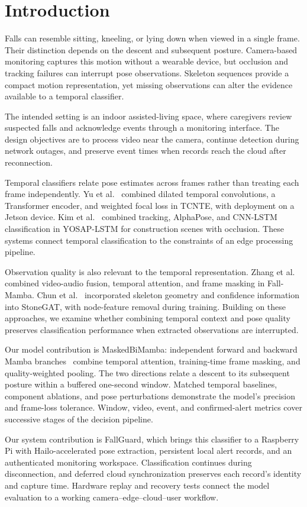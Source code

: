 \section{Introduction}

Falls can resemble sitting, kneeling, or lying down when viewed in a single frame. Their distinction depends on the descent and subsequent posture. Camera-based monitoring captures this motion without a wearable device, but occlusion and tracking failures can interrupt pose observations. Skeleton sequences provide a compact motion representation, yet missing observations can alter the evidence available to a temporal classifier.

The intended setting is an indoor assisted-living space, where caregivers review suspected falls and acknowledge events through a monitoring interface. The design objectives are to process video near the camera, continue detection during network outages, and preserve event times when records reach the cloud after reconnection.

Temporal classifiers relate pose estimates across frames rather than treating each frame independently. Yu et al.~\cite{yu2025tcnte} combined dilated temporal convolutions, a Transformer encoder, and weighted focal loss in TCNTE, with deployment on a Jetson device. Kim et al.~\cite{kim2025yosap} combined tracking, AlphaPose, and CNN-LSTM classification in YOSAP-LSTM for construction scenes with occlusion. These systems connect temporal classification to the constraints of an edge processing pipeline.

Observation quality is also relevant to the temporal representation. Zhang et al.~\cite{zhang2025fallmamba} combined video-audio fusion, temporal attention, and frame masking in Fall-Mamba. Chun et al.~\cite{chun2025stonegat} incorporated skeleton geometry and confidence information into StoneGAT, with node-feature removal during training. Building on these approaches, we examine whether combining temporal context and pose quality preserves classification performance when extracted observations are interrupted.

Our model contribution is MaskedBiMamba: independent forward and backward Mamba branches~\cite{gu2023mamba} combine temporal attention, training-time frame masking, and quality-weighted pooling. The two directions relate a descent to its subsequent posture within a buffered one-second window. Matched temporal baselines, component ablations, and pose perturbations demonstrate the model's precision and frame-loss tolerance. Window, video, event, and confirmed-alert metrics cover successive stages of the decision pipeline.

Our system contribution is FallGuard, which brings this classifier to a Raspberry Pi with Hailo-accelerated pose extraction, persistent local alert records, and an authenticated monitoring workspace. Classification continues during disconnection, and deferred cloud synchronization preserves each record's identity and capture time. Hardware replay and recovery tests connect the model evaluation to a working camera--edge--cloud--user workflow.

